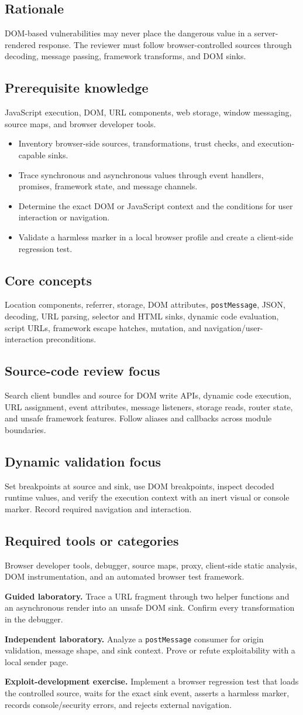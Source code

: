 \documentclass[11pt]{article}
\newcommand{\weekfield}[2]{%
  \Needspace{5\baselineskip}
  \subsection*{#1}
  #2
}
\begin{document}
\weekfield{Rationale}{DOM-based vulnerabilities may never place the dangerous
value in a server-rendered response. The reviewer must follow browser-controlled
sources through decoding, message passing, framework transforms, and DOM sinks.}

\weekfield{Prerequisite knowledge}{JavaScript execution, DOM, URL components,
web storage, window messaging, source maps, and browser developer tools.}

\begin{objectivebox}
\begin{itemize}
  \item Inventory browser-side sources, transformations, trust checks, and execution-capable sinks.
  \item Trace synchronous and asynchronous values through event handlers, promises, framework state, and message channels.
  \item Determine the exact DOM or JavaScript context and the conditions for user interaction or navigation.
  \item Validate a harmless marker in a local browser profile and create a client-side regression test.
\end{itemize}
\end{objectivebox}

\weekfield{Core concepts}{Location components, referrer, storage, DOM attributes,
\texttt{postMessage}, JSON, decoding, URL parsing, selector and HTML sinks,
dynamic code evaluation, script URLs, framework escape hatches, mutation, and
navigation/user-interaction preconditions.}

\weekfield{Source-code review focus}{Search client bundles and source for DOM
write APIs, dynamic code execution, URL assignment, event attributes, message
listeners, storage reads, router state, and unsafe framework features. Follow
aliases and callbacks across module boundaries.}

\weekfield{Dynamic validation focus}{Set breakpoints at source and sink, use DOM
breakpoints, inspect decoded runtime values, and verify the execution context with
an inert visual or console marker. Record required navigation and interaction.}

\weekfield{Required tools or categories}{Browser developer tools, debugger,
source maps, proxy, client-side static analysis, DOM instrumentation, and an
automated browser test framework.}

\begin{labbox}
\textbf{Guided laboratory.} Trace a URL fragment through two helper functions and
an asynchronous render into an unsafe DOM sink. Confirm every transformation in
the debugger.

\textbf{Independent laboratory.} Analyze a \texttt{postMessage} consumer for
origin validation, message shape, and sink context. Prove or refute exploitability
with a local sender page.

\textbf{Exploit-development exercise.} Implement a browser regression test that
loads the controlled source, waits for the exact sink event, asserts a harmless
marker, records console/security errors, and rejects external navigation.
\end{labbox}
\end{document}
